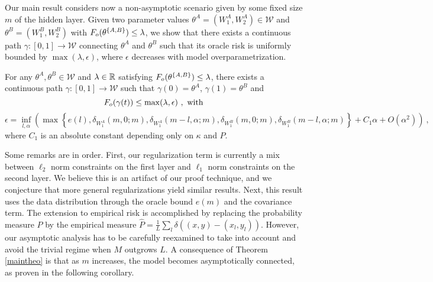 Our main result considers now a non-asymptotic scenario given by some fixed
size $m$ of the hidden layer. Given two parameter values $\theta^A = (W_1^A, W_2^A) \in \mathcal{W}$ 
and $\theta^B= (W_1^B, W_2^B)$ with $F_{o}(\theta^{\{A,B\} } ) \leq \lambda$, 
we show that there exists a continuous path 
$\gamma: [0,1] \to \mathcal{W}$ connecting $\theta^A$ and $\theta^B$ 
such that its oracle risk is uniformly bounded by $\max(\lambda, \epsilon)$, where $\epsilon$ 
decreases with model overparametrization. 
\begin{theorem}
\label{maintheo}
For any $\theta^A, \theta^B \in \mathcal{W}$ and $\lambda \in {\mathbb{R}}$ satisfying $F_{o}(\theta^{\{A,B\}}) \leq \lambda$, there exists a continuous path $\gamma: [0,1] \to \mathcal{W}$ such that
$\gamma(0) = \theta^A$, $\gamma(1) = \theta^B$ and
\begin{equation}
F_{o}( \gamma(t) )  \leq \max( \lambda, \epsilon)~,\text{ with}
\end{equation}
\begin{equation}
\epsilon = \inf_{l, \alpha} \left(\max \left\{ e(l), \delta_{W_1^A}(m, 0; m ) , \delta_{W_1^A}(m-l, \alpha; m ) ,  \delta_{W_1^B}(m, 0; m ) , \delta_{W_1^B}(m-l, \alpha; m ) \right\} + C_1 \alpha  + O(\alpha^2) \right)~,
\end{equation}
where $C_1$ is an absolute constant depending only on $\kappa$ and $P$.
\end{theorem}
Some remarks are in order. First, our regularization term is currently a mix between $\ell_2$ norm constraints on the first layer and $\ell_1$ norm constraints on the second layer. We believe this is an artifact of our proof technique, and we conjecture that more general regularizations yield similar results. Next, this result uses the data distribution through the oracle bound $e(m)$ and the covariance term. The 
extension to empirical risk is accomplished by replacing the probability measure $P$ by the empirical measure $\hat{P} = \frac{1}{L} \sum_l \delta\left( (x,y) - (x_l, y_l)\right) $. However, our asymptotic analysis has to be carefully reexamined to take into account and avoid the trivial regime when $M$ outgrows $L$.  
A consequence of Theorem \ref{maintheo} is that as $m$ increases, the model becomes asymptotically connected, as proven in the following corollary.
